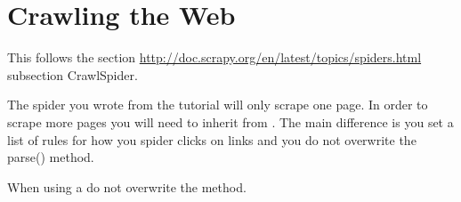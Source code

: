 \begin{comment}
class SportscrapeItem(Item):
    names = Field()
    numbers = Field()
\end{lstlisting}

And we definded our spider like so.
\begin{lstlisting}
from scrapy.spider import BaseSpider
from scrapy.selector import HtmlXPathSelector

from tutorial.items import DmozItem

class DmozSpider(BaseSpider):
   name = "dmoz"
   allowed_domains = ["dmoz.org"]
   start_urls = [
       "http://www.dmoz.org/Computers/Programming/Languages/Python/Books/",
       "http://www.dmoz.org/Computers/Programming/Languages/Python/Resources/"
   ]

   def parse(self, response):
       hxs = HtmlXPathSelector(response)
       sites = hxs.select('//ul/li')
       items = []
       for site in sites:
           item = DmozItem()
           item['title'] = site.select('a/text()').extract()
           item['link'] = site.select('a/@href').extract()
           item['desc'] = site.select('text()').extract()
           items.append(item)
       return items
\end{lstlisting}

Then I would go to the top directory and run
\begin{lstlisting}
scrapy crawl dmoz -o items.json -t json
\end{lstlisting}
which will generate a file \li{items.json} where all the scraped items are serialized in JSON.
You can also store them in csv or xml by changing all the json to csv or xml.

\end{comment}

\section*{Crawling the Web}
This follows the section \url{http://doc.scrapy.org/en/latest/topics/spiders.html} subsection CrawlSpider.

The spider you wrote from the tutorial will only scrape one page. 
In order to scrape more pages you will need to inherit from . 
The main difference is you set a list of rules for how you spider clicks on links and you do not overwrite the parse() method.

\begin{warn}
When using a  do not overwrite the  method.
\end{warn}

